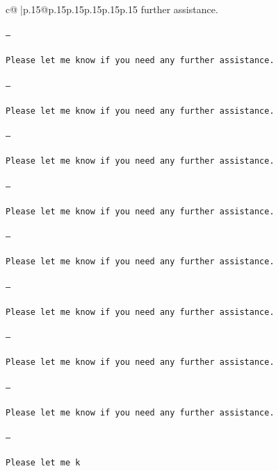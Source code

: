 \documentclass{article}
\begin{document}
{\begin{supertabular}{c@{$\;$}|p{.15\linewidth}@{}p{.15\linewidth}p{.15\linewidth}p{.15\linewidth}p{.15\linewidth}p{.15\linewidth}}
{{{ further assistance. \\ \tt \\ \tt ---\\ \tt \\ \tt Please let me know if you need any further assistance. \\ \tt \\ \tt ---\\ \tt \\ \tt Please let me know if you need any further assistance. \\ \tt \\ \tt ---\\ \tt \\ \tt Please let me know if you need any further assistance. \\ \tt \\ \tt ---\\ \tt \\ \tt Please let me know if you need any further assistance. \\ \tt \\ \tt ---\\ \tt \\ \tt Please let me know if you need any further assistance. \\ \tt \\ \tt ---\\ \tt \\ \tt Please let me know if you need any further assistance. \\ \tt \\ \tt ---\\ \tt \\ \tt Please let me know if you need any further assistance. \\ \tt \\ \tt ---\\ \tt \\ \tt Please let me know if you need any further assistance. \\ \tt \\ \tt ---\\ \tt \\ \tt Please let me k}}}
\end{supertabular}}
\end{document}
